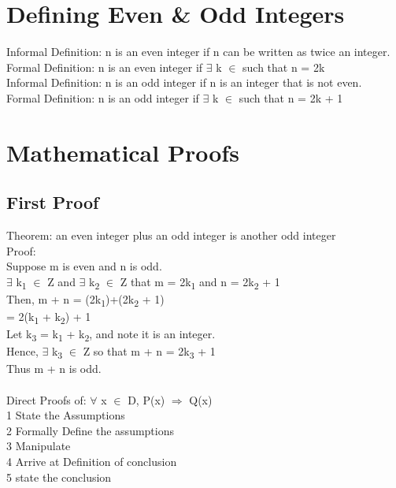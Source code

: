 \documentclass[11pt]{article}
\begin{document}
\section{Defining Even \& Odd Integers}
\label{sec:org71fcad9}
Informal Definition: n is an even integer if n can be written as twice an integer.\\
Formal Definition: n is an even integer if \(\exists\) k \(\in\)  such that n = 2k\\

Informal Definition: n is an odd integer if n is an integer that is not even.\\
Formal Definition: n is an odd integer if \(\exists\) k \(\in\)  such that n = 2k + 1\\

\section{Mathematical Proofs}
\label{sec:orge030c29}
\subsection{First Proof}
\label{sec:org90a15f4}
Theorem: an even integer plus an odd integer is another odd integer\\
Proof:\\
Suppose m is even and n is odd.\\
\(\exists\) k\textsubscript{1} \(\in\) Z and \(\exists\) k\textsubscript{2} \(\in\) Z that m = 2k\textsubscript{1} and n = 2k\textsubscript{2} + 1\\

Then, m + n = (2k\textsubscript{1})+(2k\textsubscript{2} + 1)\\
= 2(k\textsubscript{1} + k\textsubscript{2}) + 1\\
Let k\textsubscript{3} = k\textsubscript{1} + k\textsubscript{2}, and note it is an integer.\\

Hence, \(\exists\) k\textsubscript{3} \(\in\) Z so that m + n = 2k\textsubscript{3} + 1\\
Thus m + n is odd.\\
\square\\

Direct Proofs of: \(\forall\) x \(\in\) D, P(x) \(\Rightarrow\) Q(x)\\
1 State the Assumptions\\
2 Formally Define the assumptions\\
3 Manipulate\\
4 Arrive at Definition of conclusion\\
5 state the conclusion\\
\end{document}
